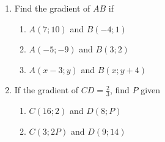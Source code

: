 \begin{exercises}{}{
\begin{enumerate}[noitemsep, label=\textbf{\arabic*}. ]
\item Find the gradient of $AB$ if
 \begin{enumerate}[noitemsep, label=\textbf{(\alph*)} ] 
\item $A(7;10)$ and $B(-4;1)$
\item $A(-5;-9)$ and $B(3;2)$
\item $A(x-3;y)$ and $B(x;y+4)$
\end{enumerate}
\item If the gradient of $CD=\frac{2}{3}$, find $P$ given
\begin{enumerate}[noitemsep, label=\textbf{(\alph*)} ] 
\item $C(16;2)$ and $D(8;P)$
\item $C(3;2P)$ and $D(9;14)$
\end{enumerate}
\end{enumerate}
}
\end{exercises}


